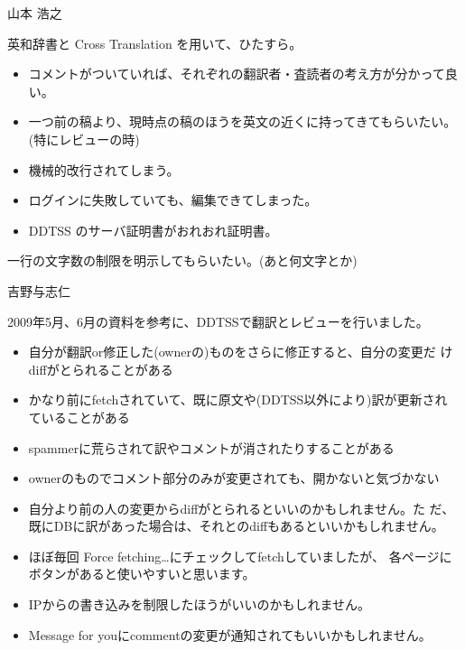\begin{prework}{山本 浩之}

英和辞書と Cross Translation を用いて、ひたすら。


\begin{itemize}
 \item コメントがついていれば、それぞれの翻訳者・査読者の考え方が分かって良い。
 \item 一つ前の稿より、現時点の稿のほうを英文の近くに持ってきてもらいたい。(特にレビューの時)
 \item 機械的改行されてしまう。
 \item ログインに失敗していても、編集できてしまった。
 \item DDTSS のサーバ証明書がおれおれ証明書。
\end{itemize}

一行の文字数の制限を明示してもらいたい。(あと何文字とか)

\end{prework}


\begin{prework}{吉野与志仁}


2009年5月、6月の資料を参考に、DDTSSで翻訳とレビューを行いました。

\begin{itemize}
 \item 自分が翻訳or修正した(ownerの)ものをさらに修正すると、自分の変更だ
       けdiffがとられることがある
 \item かなり前にfetchされていて、既に原文や(DDTSS以外により)訳が更新され
       ていることがある
 \item spammerに荒らされて訳やコメントが消されたりすることがある
 \item ownerのものでコメント部分のみが変更されても、開かないと気づかない
       
\end{itemize}

 \begin{itemize}
  \item 自分より前の人の変更からdiffがとられるといいのかもしれません。た
	だ、既にDBに訳があった場合は、それとのdiffもあるといいかもしれません。
  \item ほぼ毎回 Force fetching\dots にチェックしてfetchしていましたが、
	各ページにボタンがあると使いやすいと思います。
  \item IPからの書き込みを制限したほうがいいのかもしれません。
  \item Message for youにcommentの変更が通知されてもいいかもしれません。
 \end{itemize}
 
\end{prework}
